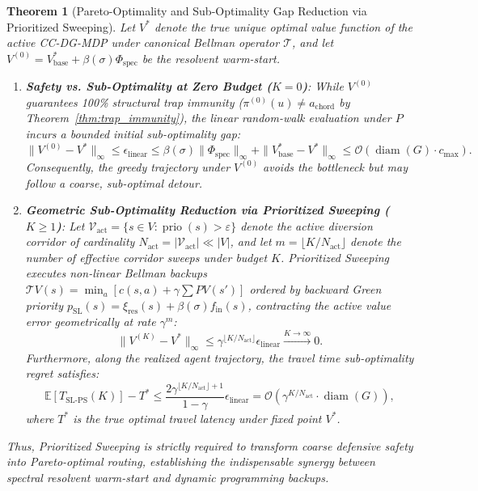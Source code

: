 \documentclass[11pt,a4paper]{article}
\newtheorem{theorem}{Theorem}
\begin{document}
\begin{theorem}[Pareto-Optimality and Sub-Optimality Gap Reduction via Prioritized Sweeping]
\label{thm:pareto_optimality}
Let $V^*$ denote the true unique optimal value function of the active CC-DG-MDP under canonical Bellman operator $\mathcal{T}$, and let $V^{(0)} = V_{\text{base}}^* + \beta(\sigma) \Phi_{\text{spec}}$ be the resolvent warm-start.
\begin{enumerate}
    \item \textbf{Safety vs. Sub-Optimality at Zero Budget ($K = 0$)}: While $V^{(0)}$ guarantees 100\% structural trap immunity ($\pi^{(0)}(u) \ne a_{\text{chord}}$ by Theorem~\ref{thm:trap_immunity}), the linear random-walk evaluation under $P$ incurs a bounded initial sub-optimality gap:
    \begin{equation}
    \label{eq:v0_suboptimality_gap}
    \|V^{(0)} - V^*\|_\infty \le \epsilon_{\text{linear}} \le \beta(\sigma) \|\Phi_{\text{spec}}\|_\infty + \|V_{\text{base}}^* - V^*\|_\infty \le \mathcal{O}(\operatorname{diam}(G) \cdot c_{\max}).
    \end{equation}
    Consequently, the greedy trajectory under $V^{(0)}$ avoids the bottleneck but may follow a coarse, sub-optimal detour.
    
    \item \textbf{Geometric Sub-Optimality Reduction via Prioritized Sweeping ($K \ge 1$)}: Let $\mathcal{V}_{\text{act}} = \{s \in V : \operatorname{prio}(s) > \varepsilon\}$ denote the active diversion corridor of cardinality $N_{\text{act}} = |\mathcal{V}_{\text{act}}| \ll |V|$, and let $m = \lfloor K / N_{\text{act}} \rfloor$ denote the number of effective corridor sweeps under budget $K$. Prioritized Sweeping executes non-linear Bellman backups $\mathcal{T} V(s) = \min_a [c(s, a) + \gamma \sum P V(s')]$ ordered by backward Green priority $p_{\text{SL}}(s) = \xi_{\text{res}}(s) + \beta(\sigma) f_{\text{in}}(s)$, contracting the active value error geometrically at rate $\gamma^m$:
    \begin{equation}
    \label{eq:vk_convergence_rate}
    \|V^{(K)} - V^*\|_\infty \le \gamma^{\lfloor K / N_{\text{act}} \rfloor} \epsilon_{\text{linear}} \xrightarrow{K \to \infty} 0.
    \end{equation}
    Furthermore, along the realized agent trajectory, the travel time sub-optimality regret satisfies:
    \begin{equation}
    \label{eq:trajectory_regret_bound}
    \mathbb{E}[T_{\text{SL-PS}}(K)] - T^* \le \frac{2 \gamma^{\lfloor K / N_{\text{act}} \rfloor + 1}}{1 - \gamma} \epsilon_{\text{linear}} = \mathcal{O}\left( \gamma^{K / N_{\text{act}}} \cdot \operatorname{diam}(G) \right),
    \end{equation}
    where $T^*$ is the true optimal travel latency under fixed point $V^*$.
\end{enumerate}
Thus, Prioritized Sweeping is strictly required to transform coarse defensive safety into Pareto-optimal routing, establishing the indispensable synergy between spectral resolvent warm-start and dynamic programming backups.
\end{theorem}
\end{document}
